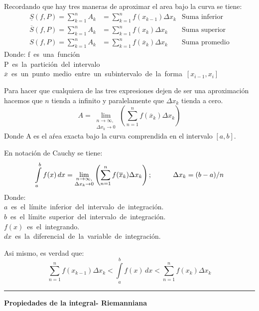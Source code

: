 \documentclass[12pt, letterpaper]{article}
\begin{document}
Recordando que hay tres maneras de aproximar el area bajo la curva se tiene:
\begin{align}
\underline{S}(f,P)=\displaystyle\sum_{k=1}^nA_k&=\sum_{k=1}^nf(x_{k-1})\Delta x_k  &\mbox{Suma inferior}\\
\overline{S}(f,P)=\displaystyle\sum_{k=1}^nA_k&=\sum_{k=1}^nf(x_{k})\Delta x_k  &\mbox{Suma superior}\\
S(f,P)=\displaystyle\sum_{k=1}^nA_k&=\sum_{k=1}^nf(\overline{x}_{k})\Delta x_k  &\mbox{Suma promedio}
\end{align}
Donde:\newline
\mbox{\hspace{1cm}f es una función}\\
\mbox{\hspace{1cm}P es la partición del intervalo}\\
\mbox{\hspace{1cm}$\overline{x}$ es un punto medio entre un subintervalo de la forma $ [x_{i-1},x_i]$}

Para hacer que cualquiera de las tres expresiones dejen de ser una aproximación hacemos que $n$ tienda a infinito y paralelamente que  $\Delta x_k$  tienda a cero.
$$A=\lim_{\substack{n \rightarrow \infty,\\\Delta x_k \rightarrow 0}} \left( \sum_{n=1}^n f(\overline{x}_k)\Delta x_k\right)$$
Donde A es el aŕea exacta bajo la curva comprendida en el intervalo $[a,b]$. 

En notación de Cauchy se tiene:
$$\int \limits_a^b f(x)\,dx=\lim_{\substack{n \rightarrow \infty,\\\Delta x_k \rightarrow 0}} \left( \sum_{n=1}^n f(\overline{x}_k)\Delta x_k\right) \mbox{;\hspace{1.0cm} } \Delta x_k=(b-a)/n$$
Donde:\\
\mbox{\hspace{1cm}$a$ es el límite inferior del intervalo de integración.}\\
\mbox{\hspace{1cm}$b$  es el límite superior del intervalo de integración.}\\
\mbox{\hspace{1cm}$f(x)$ es el integrando.}\\
\mbox{\hspace{1cm}$dx$ es la diferencial de la variable de integración.}

Asi mismo, es verdad que:\\
$$\sum_{n=1}^n f(x_{k-1})\Delta x_k<\int \limits_a^b f(x)\,dx< \sum_{n=1}^n f(x_k)\Delta x_k$$
\begin{center}\rule{15 cm}{0.1mm}\end{center}
\begin{large}\textbf{Propiedades de la integral- Riemanniana}\end{large}
\end{document}
